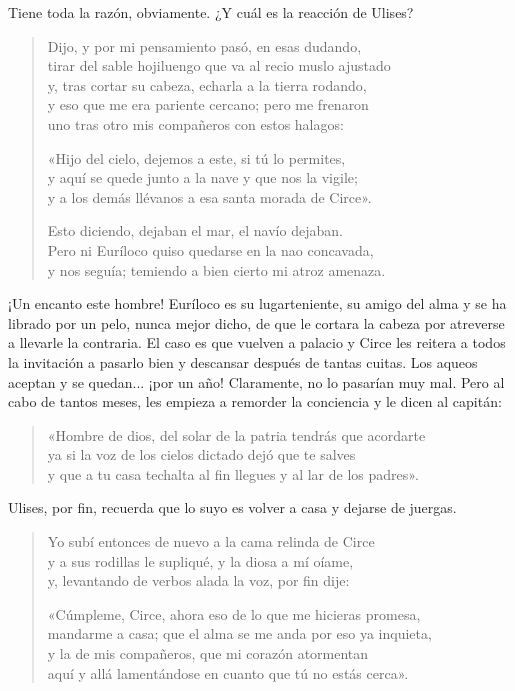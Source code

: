 Tiene toda la razón, obviamente. ¿Y cuál es la reacción de Ulises?

\begin{verse}
Dijo, y por mi pensamiento pasó, en esas dudando,\\
tirar del sable hojiluengo que va al recio muslo ajustado\\
y, tras cortar su cabeza, echarla a la tierra rodando,\\
y eso que me era pariente cercano; pero me frenaron\\
uno tras otro mis compañeros con estos halagos:

«Hijo del cielo, dejemos a este, si tú lo permites,\\
y aquí se quede junto a la nave y que nos la vigile;\\
y a los demás llévanos a esa santa morada de Circe».

Esto diciendo, dejaban el mar, el navío dejaban.\\
Pero ni Euríloco quiso quedarse en la nao concavada,\\
y nos seguía; temiendo a bien cierto mi atroz amenaza.
\end{verse}

¡Un encanto este hombre! Euríloco es su lugarteniente, su amigo del alma y se ha librado por un pelo, nunca mejor dicho, de que le cortara la cabeza por atreverse a llevarle la contraria. El caso es que vuelven a palacio y Circe les reitera a todos la invitación a pasarlo bien y descansar después de tantas cuitas. Los aqueos aceptan y se quedan... ¡por un año! Claramente, no lo pasarían muy mal. Pero al cabo de tantos meses, les empieza a remorder la conciencia y le dicen al capitán:

\begin{verse}
«Hombre de dios, del solar de la patria tendrás que acordarte\\
ya si la voz de los cielos dictado dejó que te salves\\
y que a tu casa techalta al fin llegues y al lar de los padres».
\end{verse}

Ulises, por fin, recuerda que lo suyo es volver a casa y dejarse de juergas.

\begin{verse}
Yo subí entonces de nuevo a la cama relinda de Circe\\
y a sus rodillas le supliqué, y la diosa a mí oíame,\\
y, levantando de verbos alada la voz, por fin dije:

«Cúmpleme, Circe, ahora eso de lo que me hicieras promesa,\\
mandarme a casa; que el alma se me anda por eso ya inquieta,\\
y la de mis compañeros, que mi corazón atormentan\\
aquí y allá lamentándose en cuanto que tú no estás cerca».
\end{verse}

